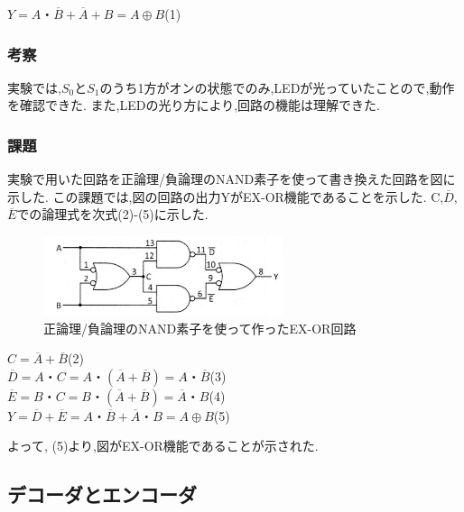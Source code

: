 \documentclass[twocolumn, 10pt,a4j]{jsarticle}
\begin{document}
    \begin{center}
      $Y = A・\overline{B} + \overline{A} + B = A \oplus B$\quad(1)
    \end{center}
  \subsubsection{考察}
   実験では,$S_{0}$と$S_{1}$のうち1方がオンの状態でのみ,LEDが光っていたことので,動作を確認できた.
   また,LEDの光り方により,回路の機能は理解できた.
  \subsubsection{課題}
    実験で用いた回路を正論理/負論理のNAND素子を使って書き換えた回路を図に示した.
    この課題では,図の回路の出力YがEX-OR機能であることを示した.
    C,$\overline{D}$,$\overline{E}$での論理式を次式(2)-(5)に示した.
    \begin{figure}[H]
      \begin{center}
        \includegraphics[width=7cm]{../img/ex_or/nand_ex_or_kairo.png}
        \caption{正論理/負論理のNAND素子を使って作ったEX-OR回路}
      \end{center}
    \end{figure}
    \begin{center}
        $C = \overline{A} + \overline{B}$\quad(2) \\
        $\overline{D} = A・C = A・(\overline{A} + \overline{B}) = A・\overline{B}$\quad(3) \\
        $\overline{E} = B・C = B・(\overline{A} + \overline{B}) = \overline{A}・B$\quad(4) \\
        $Y = \overline{D}+\overline{E}=A・\overline{B}+\overline{A}・B=A \oplus B$\quad(5) \\
    \end{center}
    よって, (5)より,図がEX-OR機能であることが示された.
\subsection{デコーダとエンコーダ}
\end{document}
